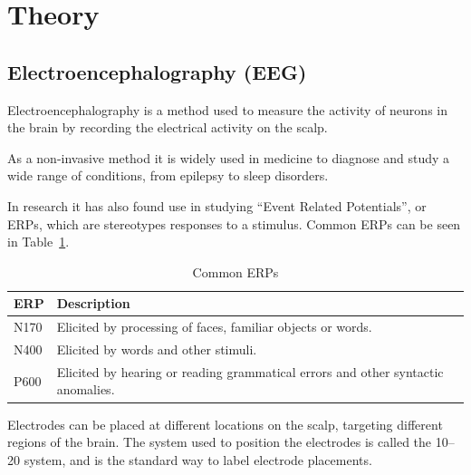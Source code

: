 \section{Theory}

\subsection{Electroencephalography (EEG)}

    Electroencephalography is a method used to measure the activity of neurons in the brain by recording the electrical activity on the scalp.

    As a non-invasive method it is widely used in medicine to diagnose and study a wide range of conditions, from epilepsy to sleep disorders.

    In research it has also found use in studying ``Event Related Potentials'', or ERPs, which are stereotypes responses to a stimulus. Common ERPs can be seen in Table~\ref{table:erps}.

    \begin{table}
        \begin{tabular}{ll}
            \toprule
            ERP & Description
            \\
            \midrule
            N170 & Elicited by processing of faces, familiar objects or words.
            \\
            N400 & Elicited by words and other stimuli.
            \\
            P600 & Elicited by hearing or reading grammatical errors and other syntactic anomalies.
            \\
            \bottomrule
        \end{tabular}
        \caption{Common ERPs}\label{table:erps}
    \end{table}

    Electrodes can be placed at different locations on the scalp, targeting different regions of the brain. The system used to position the electrodes is called the 10–20 system, and is the standard way to label electrode placements.


